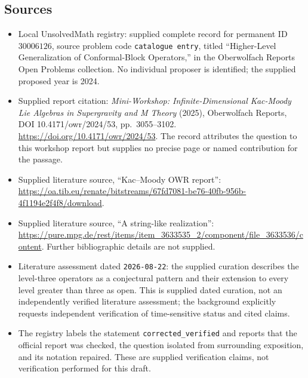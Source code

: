 \documentclass[11pt]{article}
\begin{document}
\subsection{Sources}
\begin{itemize}
\item Local UnsolvedMath registry: supplied complete record for permanent ID \(30006126\), source problem code \texttt{catalogue entry}, titled ``Higher-Level Generalization of Conformal-Block Operators,'' in the Oberwolfach Reports Open Problems collection. No individual proposer is identified; the supplied proposed year is 2024.
\item Supplied report citation: \emph{Mini-Workshop: Infinite-Dimensional Kac-Moody Lie Algebras in Supergravity and M Theory} (2025), Oberwolfach Reports, DOI 10.4171/owr/2024/53, pp.\ 3055--3102. \url{https://doi.org/10.4171/owr/2024/53}. The record attributes the question to this workshop report but supplies no precise page or named contribution for the passage.
\item Supplied literature source, ``Kac--Moody OWR report'': \url{https://oa.tib.eu/renate/bitstreams/67fd7081-be76-40fb-956b-4f1194e2f4f8/download}.
\item Supplied literature source, ``A string-like realization'': \url{https://pure.mpg.de/rest/items/item_3633535_2/component/file_3633536/content}. Further bibliographic details are not supplied.
\item Literature assessment dated \texttt{2026-08-22}: the supplied curation describes the level-three operators as a conjectural pattern and their extension to every level greater than three as open. This is supplied dated curation, not an independently verified literature assessment; the background explicitly requests independent verification of time-sensitive status and cited claims.
\item The registry labels the statement \texttt{corrected\_verified} and reports that the official report was checked, the question isolated from surrounding exposition, and its notation repaired. These are supplied verification claims, not verification performed for this draft.
\end{itemize}
\end{document}
